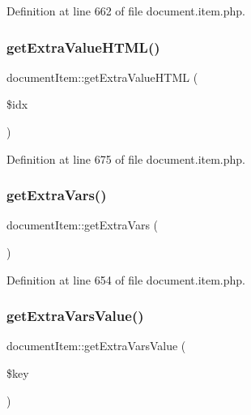 Definition at line 662 of file document.\+item.\+php.

\hypertarget{classdocumentItem_a0100c3b24a5c4b75b0edc1bfd139e77a}{}\label{classdocumentItem_a0100c3b24a5c4b75b0edc1bfd139e77a} 
\subsubsection{\texorpdfstring{get\+Extra\+Value\+H\+T\+M\+L()}{getExtraValueHTML()}}
{\footnotesize\ttfamily document\+Item\+::get\+Extra\+Value\+H\+T\+ML (\begin{DoxyParamCaption}\item[{}]{\$idx }\end{DoxyParamCaption})}



Definition at line 675 of file document.\+item.\+php.

\hypertarget{classdocumentItem_afe41c70dfb21cc8b8d397a3af24eb895}{}\label{classdocumentItem_afe41c70dfb21cc8b8d397a3af24eb895} 
\subsubsection{\texorpdfstring{get\+Extra\+Vars()}{getExtraVars()}}
{\footnotesize\ttfamily document\+Item\+::get\+Extra\+Vars (\begin{DoxyParamCaption}{ }\end{DoxyParamCaption})}



Definition at line 654 of file document.\+item.\+php.

\hypertarget{classdocumentItem_ab555cb21a9a50d683836b8d4604d47f5}{}\label{classdocumentItem_ab555cb21a9a50d683836b8d4604d47f5} 
\subsubsection{\texorpdfstring{get\+Extra\+Vars\+Value()}{getExtraVarsValue()}}
{\footnotesize\ttfamily document\+Item\+::get\+Extra\+Vars\+Value (\begin{DoxyParamCaption}\item[{}]{\$key }\end{DoxyParamCaption})}



